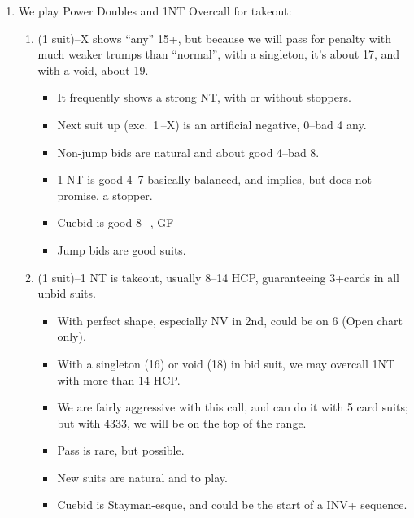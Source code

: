 \documentclass[12pt]{article}
\begin{document}
\begin{scriptsize}
\begin{enumerate}
            This applies to:
            \begin{itemize}[nosep]
                \item Woolsey overcalls of 1 NT
                \item Michaels cuebids
            \end{itemize}
        \newpage
        \item We play Power Doubles and 1NT Overcall for takeout:
        \begin{enumerate}[label*=\arabic*,nosep]
            \item \label{itm:pd}(1 suit)--X shows ``any'' 15+, but because we will pass for penalty with much weaker trumps than ``normal'', with a singleton, it's about 17, and with a void, about 19.
            \begin{itemize}
                \item It frequently shows a strong NT, with or without stoppers.
                \item Next suit up (exc.\ 1\,\bs--X) is an artificial negative, 0--bad 4 any.
                \item Non-jump bids are natural and about good 4--bad 8.
                \item 1 NT is good 4--7 basically balanced, and implies, but does not promise, a stopper.
                \item Cuebid is good 8+, GF
                \item Jump bids are good suits.
            \end{itemize}
            \item \label{itm:1ntoc}(1 suit)--1 NT is takeout, usually 8--14 HCP, guaranteeing 3+cards in all unbid suits.
            \begin{itemize}
                \item With perfect shape, especially NV in 2nd, could be on 6 (Open chart only).
                \item With a singleton (16) or void (18) in bid suit, we may overcall 1NT with more than 14 HCP\@.
                \item We are fairly aggressive with this call, and can do it with 5 card suits; but with 4333, we will be on the top of the range.
                \item Pass is rare, but possible.
                \item New suits are natural and to play.
                \item Cuebid is Stayman-esque, and could be the start of a INV+ sequence.

\end{itemize}
\end{enumerate}
\end{enumerate}
\end{scriptsize}
\end{document}
